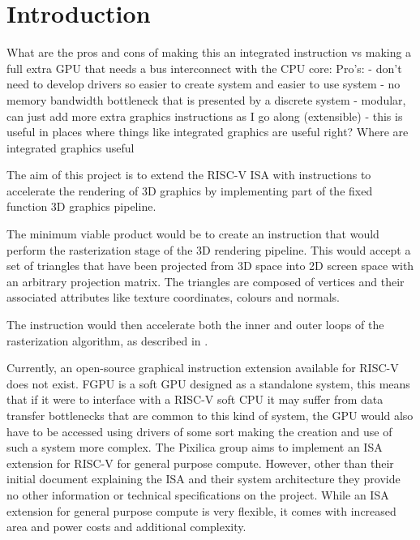 \chapter{Introduction}\label{chapter:introduction}



What are the pros and cons of making this an integrated instruction vs making a full extra GPU that needs a bus interconnect with the CPU core:
Pro's:
- don't need to develop drivers so easier to create system and easier to use system
- no memory bandwidth bottleneck that is presented by a discrete system
- modular, can just add more extra graphics instructions as I go along (extensible)
- this is useful in places where things like integrated graphics are useful right? Where are integrated graphics useful 





The aim of this project is to extend the RISC-V ISA with instructions to accelerate the rendering of 3D graphics by implementing part of the fixed function 3D graphics pipeline.

The minimum viable product would be to create an instruction that would perform the rasterization stage of the 3D rendering pipeline. This would accept a set of triangles that have been projected from 3D space into 2D screen space with an arbitrary projection matrix. The triangles are composed of vertices and their associated attributes like texture coordinates, colours and normals.

The instruction would then accelerate both the inner and outer loops of the rasterization algorithm, as described in .

Currently, an open-source graphical instruction extension available for RISC-V does not exist. FGPU\cite{FGPU} is a soft GPU designed as a standalone system, this means that if it were to interface with a RISC-V soft CPU it may suffer from data transfer bottlenecks that are common to this kind of system, the
GPU would also have to be accessed using drivers of some sort making the creation and use of such
a system more complex.
The Pixilica group \cite{pixillicaRV64X} aims to implement an ISA extension for RISC-V for general purpose compute.
However, other than their initial document explaining the ISA and their system architecture they
provide no other information or technical specifications on the project.
While an ISA extension for general purpose compute is very flexible, it comes with increased area and power costs and additional complexity.

